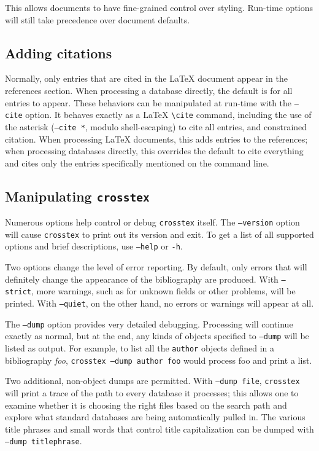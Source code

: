 \documentclass{article}
\begin{document}
This allows documents to have fine-grained control over styling. Run-time
options will still take precedence over document defaults.

\subsection{Adding citations}

Normally, only entries that are cited in the \LaTeX{} document appear
in the references section.  When processing a database directly,
the default is for all entries to appear.  These behaviors can be
manipulated at run-time with the \texttt{--cite} option.  It behaves
exactly as a \LaTeX{} \verb"\cite" command, including the use of the
asterisk (\texttt{--cite *}, modulo shell-escaping) to cite all entries,
and constrained citation.  When processing \LaTeX{} documents, this
adds entries to the references; when processing databases directly,
this overrides the default to cite everything and cites only the entries
specifically mentioned on the command line.

\subsection{Manipulating \texttt{crosstex}}

Numerous options help control or debug \texttt{crosstex} itself.  The
\texttt{--version} option will cause \texttt{crosstex} to print out its
version and exit.  To get a list of all supported options and brief
descriptions, use \texttt{--help} or \texttt{-h}.

Two options change the level of error reporting.  By default, only
errors that will definitely change the appearance of the bibliography
are produced.  With \texttt{--strict}, more warnings, such as for unknown
fields or other problems, will be printed.  With \texttt{--quiet}, on the
other hand, no errors or warnings will appear at all.

The \texttt{--dump} option provides very detailed debugging.  Processing
will continue exactly as normal, but at the end, any kinds of objects
specified to \texttt{--dump} will be listed as output.  For example, to
list all the \texttt{author} objects defined in a bibliography \textit{foo},
\texttt{crosstex --dump author foo} would process foo and print a list.

Two additional, non-object dumps are permitted.  With \texttt{--dump~file},
\texttt{crosstex} will print a trace of the path to every database it
processes; this allows one to examine whether it is choosing the right files
based on the search path and explore what standard databases are being
automatically pulled in.  The various title phrases and small words that
control title capitalization can be dumped with \texttt{--dump~titlephrase}.
\end{document}
